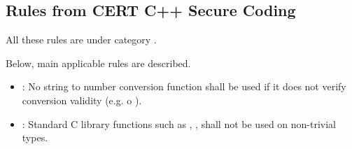 \subsection{Rules from CERT C++ Secure Coding}

All these rules are under category
.

Below, main applicable rules are described.

\begin{itemize}

\item {}:
No string to number conversion function shall be used if
it does not verify conversion validity (e.g.   o ).

\item {}:
Standard C library functions such as
, ,  
shall not be used on non-trivial types.

\end{itemize}
